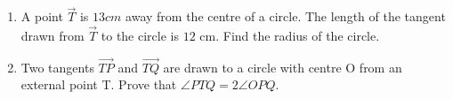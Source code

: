 \documentclass{article}
\begin{document}
\begin{enumerate}
			
	
\item  A point $\vec{T}$ is $13 cm$ away from the centre of a circle. The length of the tangent drawn from $\vec{T}$ to the circle is $12$ cm. Find the radius of the circle. 
	
\item  Two tangents $ \vec{TP} $ and $ \vec{TQ} $ are drawn to a circle with centre O from an external point T. Prove that $\angle PTQ= 2 \angle OPQ$. 



% 	
	

\end{enumerate}
\end{document}
